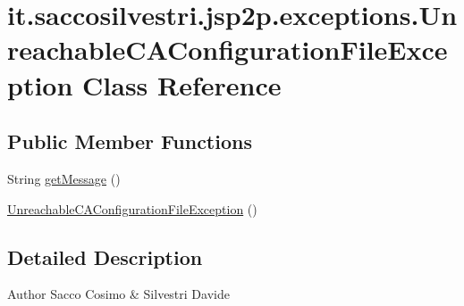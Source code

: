 \hypertarget{classit_1_1saccosilvestri_1_1jsp2p_1_1exceptions_1_1_unreachable_c_a_configuration_file_exception}{
\section{it.saccosilvestri.jsp2p.exceptions.\-Unreachable\-C\-A\-Configuration\-File\-Exception \-Class \-Reference}
\label{classit_1_1saccosilvestri_1_1jsp2p_1_1exceptions_1_1_unreachable_c_a_configuration_file_exception}
}
\subsection*{\-Public \-Member \-Functions}
\begin{DoxyCompactItemize}
\item 
\-String \hyperlink{classit_1_1saccosilvestri_1_1jsp2p_1_1exceptions_1_1_unreachable_c_a_configuration_file_exception_ad0830feda07e6f01d8d70f4e160e515e}{get\-Message} ()
\item 
\hyperlink{classit_1_1saccosilvestri_1_1jsp2p_1_1exceptions_1_1_unreachable_c_a_configuration_file_exception_ad42cad00abd63b1e26efe8961f49523f}{\-Unreachable\-C\-A\-Configuration\-File\-Exception} ()
\end{DoxyCompactItemize}


\subsection{\-Detailed \-Description}
\begin{DoxyAuthor}{\-Author}
\-Sacco \-Cosimo \& \-Silvestri \-Davide 
\end{DoxyAuthor}


